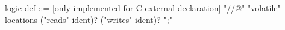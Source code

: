 \begin{syntax}
  logic-def ::= {[only implemented for C-external-declaration] "//@" "volatile" locations ("reads" ident)? ("writes" ident)? ";"}
\end{syntax}

